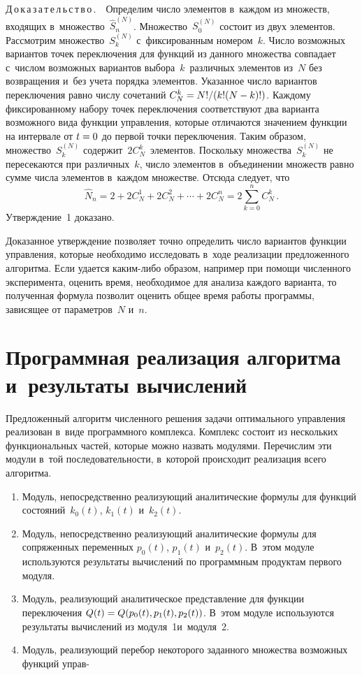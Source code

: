 \begin{multicols}{2}
\noindent
Д\,о\,к\,а\,з\,а\,т\,е\,л\,ь\,с\,т\,в\,о\,.\ \ 
Определим число элементов в~каждом из множеств, входящих в~множество~$\hat S^{(N)}_n$. 
Множество~$S^{(N)}_0$ состоит из двух элементов. Рассмотрим множество~$S^{(N)}_k$ 
с~фиксированным номером~$k$. Число возможных вариантов точек переключения для 
функций из данного множества совпадает с~числом возможных вариантов выбора~$k$~различных 
элементов из~$N$ без возвращения и~без учета порядка элементов. Указанное число 
вариантов переключения равно числу сочетаний $C^k_N \hm= {N!}/({k! (N - k)!})$. 
Каждому фиксированному набору точек переключения соответствуют два варианта 
возможного вида функции управления, которые отличаются значением функции на 
интервале от $t\hm=0$ до первой точки переключения. Таким образом, 
множество~$ S^{(N)}_k$ содержит~$2 C^k_N$~элементов. Поскольку множества~$S^{(N)}_k$ 
не пересекаются при различных~$k$, чис\-ло элементов в~объединении множеств равно 
сумме чис\-ла элементов в~каждом множестве. Отсюда следует, что
\begin{equation*} 
\hat N_n = 2 + 2 C^1_N + 2 C^2_N + \cdots + 2 C^n_N = 2 \sum \limits_{k=0}^{n} C^{k}_{N}\,.
\end{equation*}
Утверждение~1 доказано.

Доказанное утверждение позволяет точно определить число вариантов функции 
управления, которые необходимо исследовать в~ходе реализации предложенного алгоритма. 
Если удается ка\-ким-ли\-бо образом, например при помощи численного эксперимента, 
оценить время, необходимое для анализа каждого варианта, то полученная формула 
позволит оценить общее время работы программы, зависящее от параметров~$N$ и~$n$.


\section{Программная реализация алгоритма и~результаты вычислений}

Предложенный алгоритм численного решения задачи оптимального управления реализован 
в~виде программного комплекса. Комплекс состоит из нескольких функциональных частей, 
которые можно назвать модулями. Перечислим эти модули в~той последовательности, 
в~которой происходит реализация всего алгоритма.
\begin{enumerate}[1.]
\item Модуль, непосредственно реализующий аналитические формулы для функций 
состояний~$k_0(t)$, $k_1(t)$ и~$k_2(t)$.
\item Модуль, непосредственно реализующий аналитические формулы для сопряженных 
переменных $p_0(t)$, $p_1(t)$  и~$p_2(t)$. В~этом модуле используются результаты вычислений 
по программным продуктам первого модуля.
\item Модуль, реализующий аналитическое пред\-став\-ле\-ние для функции 
переключения $Q(t)\hm=Q(p_0(t),p_1(t),p_2(t))$. В~этом модуле используются результаты 
вычислений из модуля~1\linebreak и~модуля~2.
\item  Модуль, реализующий перебор некоторого заданного множества возможных 
функций управ-\linebreak\vspace*{-12pt}


\end{enumerate}
\end{multicols}
